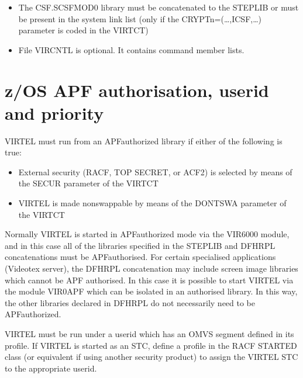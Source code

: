 \documentclass[letterpaper,10pt,english]{sphinxmanual}
\begin{document}
\begin{itemize}
\item {} 
\sphinxAtStartPar
The CSF.SCSFMOD0 library must be concatenated to the STEPLIB or must be present in the system link list (only if the CRYPTn=(…,ICSF,…) parameter is coded in the VIRTCT)

\item {} 
\sphinxAtStartPar
File VIRCNTL is optional. It contains command member lists.

\end{itemize}

\newpage

\ignorespaces 

\section{z/OS APF authorisation, userid and priority}
\label{\detokenize{Installation_Guide:z-os-apf-authorisation-userid-and-priority}}\label{\detokenize{Installation_Guide:index-9}}
\sphinxAtStartPar
VIRTEL must run from an APF\sphinxhyphen{}authorized library if either of the following is true:
\begin{itemize}
\item {} 
\sphinxAtStartPar
External security (RACF, TOP SECRET, or ACF2) is selected by means of the SECUR parameter of the VIRTCT

\item {} 
\sphinxAtStartPar
VIRTEL is made non\sphinxhyphen{}swappable by means of the DONTSWA parameter of the VIRTCT

\end{itemize}

\sphinxAtStartPar
Normally VIRTEL is started in APF\sphinxhyphen{}authorized mode via the VIR6000 module, and in this case all of the libraries specified in the STEPLIB and DFHRPL concatenations must be APF\sphinxhyphen{}authorised. For certain specialised applications (Videotex server), the DFHRPL concatenation may include screen image libraries which cannot be APF authorised. In this case it is possible to start VIRTEL via the module VIR0APF which can be isolated in an authorised library. In this way, the other libraries declared in DFHRPL do not necessarily need to be APF\sphinxhyphen{}authorized.

\sphinxAtStartPar
VIRTEL must be run under a userid which has an OMVS segment defined in its profile. If VIRTEL is started as an STC, define a profile in the RACF STARTED class (or equivalent if using another security product) to assign the VIRTEL STC to the appropriate userid.
\end{document}
